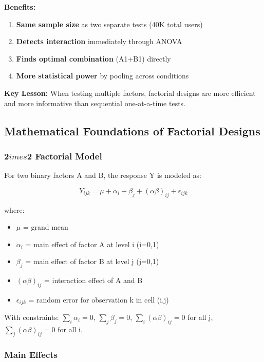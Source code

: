 \textbf{Benefits:}
\begin{enumerate}
    \item \textbf{Same sample size} as two separate tests (40K total users)
    \item \textbf{Detects interaction} immediately through ANOVA
    \item \textbf{Finds optimal combination} (A1+B1) directly
    \item \textbf{More statistical power} by pooling across conditions
\end{enumerate}

\textbf{Key Lesson:} When testing multiple factors, factorial designs are more efficient and more informative than sequential one-at-a-time tests.

\subsection{Mathematical Foundations of Factorial Designs}

\subsubsection{2$	imes$2 Factorial Model}

For two binary factors A and B, the response Y is modeled as:

\begin{equation}
Y_{ijk} = \mu + \alpha_i + \beta_j + (\alpha\beta)_{ij} + \epsilon_{ijk}
\end{equation}

where:
\begin{itemize}
    \item $\mu$ = grand mean
    \item $\alpha_i$ = main effect of factor A at level i (i=0,1)
    \item $\beta_j$ = main effect of factor B at level j (j=0,1)
    \item $(\alpha\beta)_{ij}$ = interaction effect of A and B
    \item $\epsilon_{ijk}$ = random error for observation k in cell (i,j)
\end{itemize}

With constraints: $\sum_i \alpha_i = 0$, $\sum_j \beta_j = 0$, $\sum_i (\alpha\beta)_{ij} = 0$ for all j, $\sum_j (\alpha\beta)_{ij} = 0$ for all i.

\subsubsection{Main Effects}

